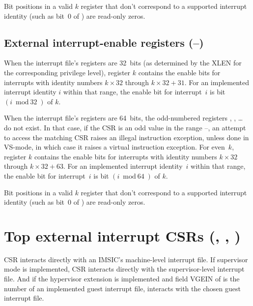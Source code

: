 Bit positions in a valid $k$ register that don't correspond
to a supported interrupt identity (such as bit~0 of ) are
read-only zeros.

\subsection{External interrupt-enable registers (--)}

When the interrupt file's registers are 32~bits (as determined by
the XLEN for the corresponding privilege level), register $k$
contains the enable bits for interrupts with identity numbers
$k\times\mbox{32}$ through ${k\times\mbox{32} + \mbox{31}}$.
For an implemented interrupt identity $i$ within that range, the enable
bit for interrupt~$i$ is bit $(i\bmod\mbox{32})$ of $k$.

When the interrupt file's registers are 64~bits, the odd-numbered
registers , , \dots {} do not exist.
In that case, if the  CSR is an odd value in the range
--, an attempt to access the matching  CSR
raises an illegal instruction exception, unless done in VS-mode, in
which case it raises a virtual instruction exception.
For even~$k$, register $k$ contains the enable bits for
interrupts with identity numbers $k\times\mbox{32}$ through
${k\times\mbox{32} + \mbox{63}}$.
For an implemented interrupt identity~$i$ within that range, the enable
bit for interrupt~$i$ is bit $(i\bmod\mbox{64})$ of $k$.

Bit positions in a valid $k$ register that don't correspond
to a supported interrupt identity (such as bit~0 of ) are
read-only zeros.

\section{%
Top external interrupt CSRs (, , )%
}

CSR  interacts directly with
an IMSIC's machine-level interrupt file.
If supervisor mode is implemented, CSR  interacts
directly with the supervisor-level interrupt file.
And if the hypervisor extension is implemented and field VGEIN of
 is the number of an implemented guest interrupt file,
 interacts with the chosen guest interrupt file.

